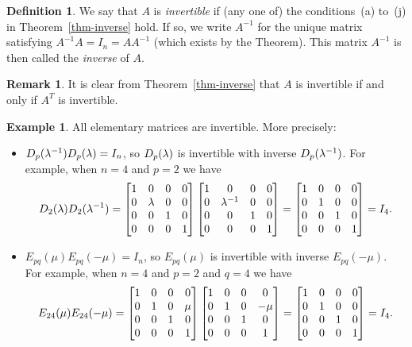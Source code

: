 \documentclass[reqno]{amsart}
\theoremstyle{definition}
\newtheorem{remark}[theorem]{Remark}
\newtheorem{definition}[theorem]{Definition}
\newtheorem{example}[theorem]{Example}
\newcommand{\dfn}[1]{\emph{{#1}}\index{#1}}
\begin{document}
\begin{definition}\label{defn-invertible}
 We say that $A$ is \dfn{invertible} if (any one of) the
 conditions~(a) to~(j) in Theorem~\ref{thm-inverse} hold.  If so, we
 write $A^{-1}$ for the unique matrix satisfying $A^{-1}A=I_n=AA^{-1}$
 (which exists by the Theorem).
 This matrix $A^{-1}$ is then called the \dfn{inverse} of $A$.
\end{definition}

\begin{remark}\label{rem-transpose-inverse}
 It is clear from Theorem~\ref{thm-inverse} that $A$ is invertible if
 and only if $A^T$ is invertible.
\end{remark}

\begin{example}\label{eg-elem-invertible}
 All elementary matrices are invertible.  More precisely:
 \begin{itemize}
  \item[(a)] $D_p(\lambda^{-1})D_p(\lambda)=I_n$, so $D_p(\lambda)$ is invertible
   with inverse $D_p(\lambda^{-1})$.  For example, when $n=4$ and $p=2$ we
   have 
   \[ 
    D_2(\lambda)D_2(\lambda^{-1}) = 
    \left[\begin{matrix} 1&0&0&0 \\ 0&\lambda&0&0 \\ 0&0&1&0 \\ 0&0&0&1 \end{matrix}\right]
    \left[\begin{matrix} 1&0&0&0 \\ 0&\lambda^{-1}&0&0 \\ 0&0&1&0 \\ 0&0&0&1 \end{matrix}\right]
    =
    \left[\begin{matrix} 1&0&0&0 \\ 0&1&0&0 \\ 0&0&1&0 \\ 0&0&0&1 \end{matrix}\right]
    = I_4.
   \] 
  \item[(b)] $E_{pq}(\mu)E_{pq}(-\mu)=I_n$, so $E_{pq}(\mu)$ is
   invertible with inverse $E_{pq}(-\mu)$.  For example, when $n=4$
   and $p=2$ and $q=4$ we have 
   \[ 
    E_{24}(\mu)E_{24}(-\mu) = 
    \left[\begin{matrix} 1&0&0&0 \\ 0&1&0&\mu \\ 0&0&1&0 \\ 0&0&0&1 \end{matrix}\right]
    \left[\begin{matrix} 1&0&0&0 \\ 0&1&0&-\mu \\ 0&0&1&0 \\ 0&0&0&1 \end{matrix}\right]
    =
    \left[\begin{matrix} 1&0&0&0 \\ 0&1&0&0 \\ 0&0&1&0 \\ 0&0&0&1 \end{matrix}\right]
    = I_4.
\]
\end{itemize}
\end{example}
\end{document}
